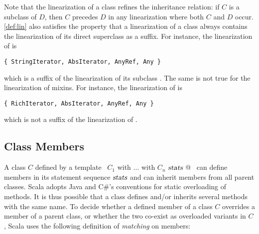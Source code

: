 Note that the linearization of a class refines the inheritance
relation: if $C$ is a subclass of $D$, then $C$ precedes $D$ in any
linearization where both $C$ and $D$ occur.
\ref{def:lin} also satisfies the property that a linearization
of a class always contains the linearization of its direct superclass
as a suffix.  For instance, the linearization of
\lstinline@StringIterator@ is
\begin{lstlisting}
{ StringIterator, AbsIterator, AnyRef, Any }
\end{lstlisting}
which is a suffix of the linearization of its subclass \lstinline@Iter@.
The same is not true for the linearization of mixins.
For instance, the linearization of \lstinline@RichIterator@ is
\begin{lstlisting}
{ RichIterator, AbsIterator, AnyRef, Any }
\end{lstlisting}
which is not a suffix of the linearization of \lstinline@Iter@.


\subsection{Class Members}
\label{sec:members}

A class $C$ defined by a template 
~\lstinline@$C_1$ with $\ldots$ with $C_n$ { $\mbox{\sl stats}$ }@~ 
can define members in its statement sequence
$\mbox{\sl stats}$ and can inherit members from all parent classes.  Scala
adopts Java and C\#'s conventions for static overloading of
methods. It is thus possible that a class defines and/or inherits
several methods with the same name.  To decide whether a defined
member of a class $C$ overrides a member of a parent class, or whether
the two co-exist as overloaded variants in $C$, Scala uses the
following definition of {\em matching} on members:

